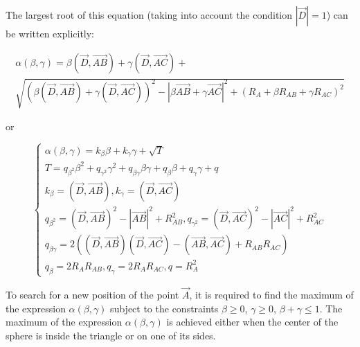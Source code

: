 \documentclass[
11pt,%
tightenlines,%
twoside,%
onecolumn,%
nofloats,%
nobibnotes,%
nofootinbib,%
superscriptaddress,%
noshowpacs,%
centertags]%
{revtex4-2}
\begin{document}
The largest root of this equation (taking into account the condition $|\vec{D}| = 1$) can be written explicitly:

\begin{multline}
\alpha(\beta, \gamma) = \beta (\vec{D}, \vec{AB}) + \gamma (\vec{D}, \vec{AC}) + \\
\sqrt{(\beta (\vec{D}, \vec{AB}) + \gamma (\vec{D}, \vec{AC}))^2 - |\beta \vec{AB} + \gamma \vec{AC}|^2 + (R_A + \beta R_{AB} + \gamma R_{AC})^2}
\end{multline}

or

\begin{equation}
\begin{cases}
\alpha(\beta, \gamma) = k_{\beta} \beta + k_{\gamma} \gamma + \sqrt{T} \\
T = q_{\beta^2} \beta^2 + q_{\gamma^2} \gamma^2 + q_{\beta \gamma} \beta \gamma + q_{\beta} \beta + q_{\gamma} \gamma + q \\
k_{\beta} = (\vec{D}, \vec{AB}), k_{\gamma} = (\vec{D}, \vec{AC}) \\
q_{\beta^2} = (\vec{D}, \vec{AB})^2 - |\vec{AB}|^2 + R_{AB}^2, q_{\gamma^2} = (\vec{D}, \vec{AC})^2 - |\vec{AC}|^2 + R_{AC}^2 \\
q_{\beta \gamma} = 2 ((\vec{D}, \vec{AB})(\vec{D}, \vec{AC}) - (\vec{AB}, \vec{AC}) + R_{AB} R_{AC}) \\
q_{\beta} = 2 R_A R_{AB}, q_{\gamma} = 2 R_A R_{AC}, q = R_A^2
\end{cases}
\end{equation}

To search for a new position of the point $\vec{A}$, it is required to find the maximum of the expression $\alpha(\beta, \gamma)$ subject to the constraints $\beta \ge 0$, $\gamma \ge 0$, $\beta + \gamma \le 1$.
The maximum of the expression $\alpha(\beta, \gamma)$ is achieved either when the center of the sphere is inside the triangle or on one of its sides.
\end{document}
